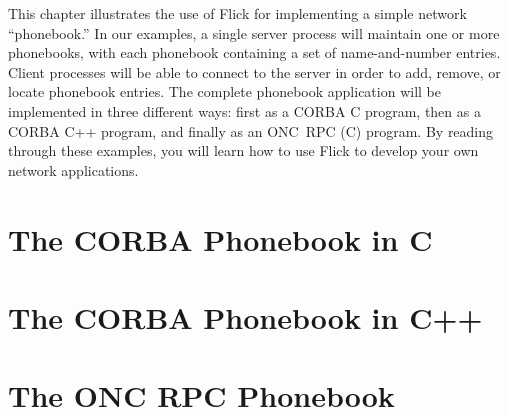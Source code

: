 

This chapter illustrates the use of Flick for implementing a simple network
``phonebook.''  In our examples, a single server process will maintain one or
more phonebooks, with each phonebook containing a set of name-and-number
entries.  Client processes will be able to connect to the server in order to
add, remove, or locate phonebook entries.  The complete phonebook application
will be implemented in three different ways: first as a CORBA C program, then
as a CORBA C++ program, and finally as an ONC~RPC (C) program.  By reading
through these examples, you will learn how to use Flick to develop your own
network applications.



\section{The CORBA Phonebook in C}
\label{sec:The CORBA Phonebook in C}





\section{The CORBA Phonebook in C++}
\label{sec:The CORBA Phonebook in C++}





\section{The ONC RPC Phonebook}
\label{sec:The ONC RPC Phonebook}






